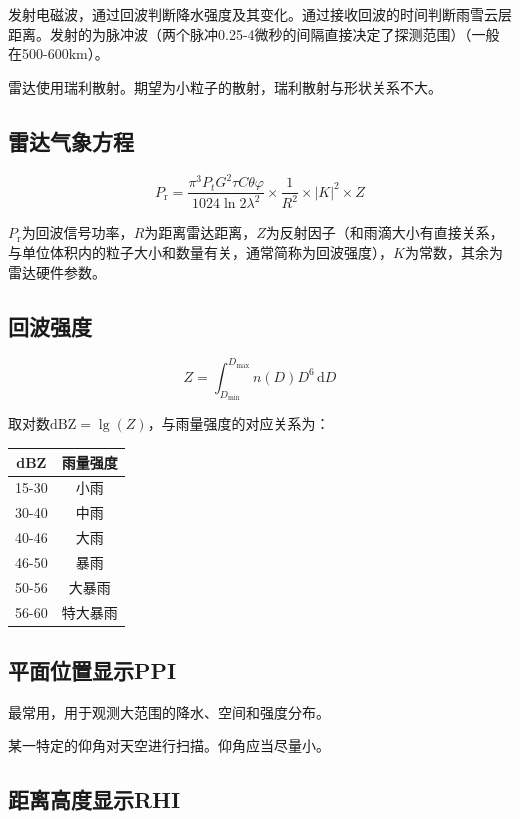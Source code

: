\documentclass[UTF8,11pt]{ctexbook}
\begin{document}
发射电磁波，通过回波判断降水强度及其变化。通过接收回波的时间判断雨雪云层距离。发射的为脉冲波（两个脉冲0.25-4微秒的间隔直接决定了探测范围）（一般在500-600km）。

雷达使用瑞利散射。期望为小粒子的散射，瑞利散射与形状关系不大。

\subsection{雷达气象方程}
\[
P_\mathrm{r}=\frac{\pi^3P_tG^2\tau C\theta\varphi}{1024\ln2\lambda^2}\times\frac{1}{R^2}\times|K|^2\times Z
\]

\(P_\mathrm{r}\)为回波信号功率，\(R\)为距离雷达距离，\(Z\)为反射因子（和雨滴大小有直接关系，与单位体积内的粒子大小和数量有关，通常简称为回波强度），\(K\)为常数，其余为雷达硬件参数。

\subsection{回波强度}
\[
Z=\int_{D_\mathrm{min}}^{D_\mathrm{max}}n(D)D^6\,\mathrm{d}D
\]

取对数\(\mathrm{dBZ}=\lg(Z)\)，与雨量强度的对应关系为：
\begin{table}[htbp]
    \centering
    \begin{tabular}{cc}
        \toprule
        dBZ & 雨量强度\\
        \midrule
        15-30 & 小雨\\
        30-40 & 中雨\\
        40-46 & 大雨\\
        46-50 & 暴雨\\
        50-56 & 大暴雨\\
        56-60 & 特大暴雨\\
        \bottomrule
    \end{tabular}
\end{table}

\subsection{平面位置显示PPI}

最常用，用于观测大范围的降水、空间和强度分布。

某一特定的仰角对天空进行扫描。仰角应当尽量小。

\subsection{距离高度显示RHI}
\end{document}
